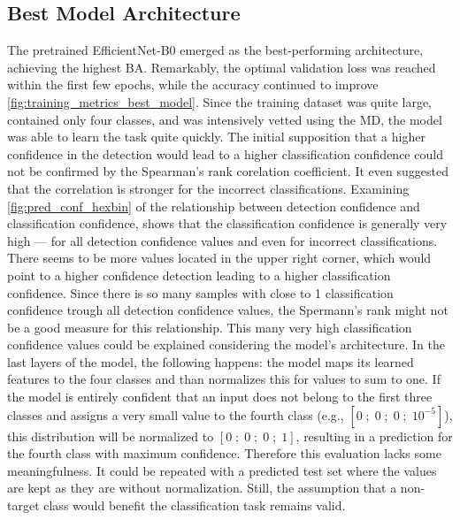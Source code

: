 \subsection{Best Model Architecture}
The pretrained EfficientNet-B0 emerged as the best-performing architecture, achieving the highest \ac{BA}.
Remarkably, the optimal validation loss was reached within the first few epochs, while the accuracy continued to improve \autoref{fig:training_metrics_best_model}.
Since the training dataset was quite large, contained only four classes, and was intensively vetted using the \ac{MD}, the model was able to learn the task quite quickly.
The initial supposition that a higher confidence in the detection would lead to a higher classification confidence could not be confirmed by the Spearman's rank corelation coefficient.
It even suggested that the correlation is stronger for the incorrect classifications.
Examining \autoref{fig:pred_conf_hexbin} of the relationship between detection confidence and classification confidence, shows that the classification confidence is generally very high --- for all detection confidence values and even for incorrect classifications.
There seems to be more values located in the upper right corner, which would point to a higher confidence detection leading to a higher classification confidence.
Since there is so many samples with close to 1 classification confidence trough all detection confidence values, the Spermann's rank might not be a good measure for this relationship.
This many very high classification confidence values could be explained considering the model's architecture.
In the last layers of the model, the following happens: the model maps its learned features to the four classes and than normalizes this for values to sum to one.
If the model is entirely confident that an input does not belong to the first three classes and assigns a very small value to the fourth class (e.g., $[0\;;\;0\;;\;0\;;\;10^{-5}]$), this distribution will be normalized to $[0\;;\;0\;;\;0\;;\;1]$, resulting in a prediction for the fourth class with maximum confidence.
Therefore this evaluation lacks some meaningfulness.
It could be repeated with a predicted test set where the values are kept as they are without normalization.
Still, the assumption that a non-target class would benefit the classification task remains valid.

